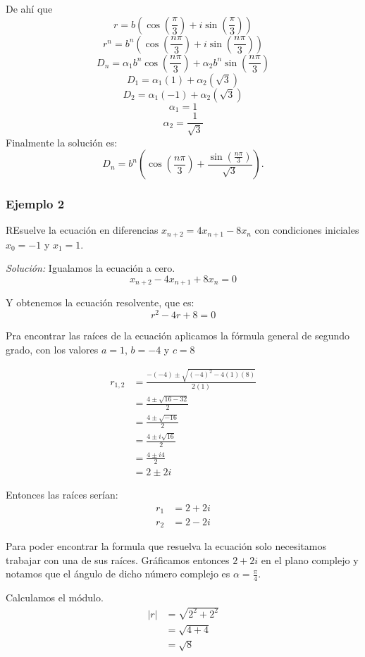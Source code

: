 \documentclass{report}
\begin{document}
De ahí que
  $$r=b(\cos(\frac{\pi}{3})+i\sin(\frac{\pi}{3}))$$
  $$r^n=b^n(\cos(\frac{n\pi}{3})+i\sin(\frac{n\pi}{3}))$$
  $$D_{n}=\alpha_{1}b^n\cos(\frac{n\pi}{3})+\alpha_{2}b^n\sin(\frac{n\pi}{3})$$
  $$D_{1}=\alpha_{1}(1)+\alpha_{2}(\sqrt{3})$$
  $$D_{2}=\alpha_{1}(-1)+\alpha_{2}(\sqrt{3})$$
  $$\alpha_{1}=1$$
  $$\alpha_{2}=\frac{1}{\sqrt{3}}$$
Finalmente la solución es:
\begin{equation}
  \label{solucion determinante}
D_{n}=b^n(\cos(\frac{n\pi}{3})+\frac{\sin(\frac{n\pi}{3})}{\sqrt{3}}).
\end{equation}

\subsubsection{Ejemplo 2}
REsuelve la ecuación en diferencias $x_{n+2}=4x_{n+1}-8x_n$ con condiciones iniciales $x_0=-1$ y $x_1=1$.

\textit{Solución:} 
Igualamos la ecuación a cero.
$$x_{n+2}-4x_{n+1}+8x_n=0$$

Y obtenemos la ecuación resolvente, que es: 
$$r^2-4r+8=0$$

Pra encontrar las raíces de la ecuación aplicamos la fórmula general de segundo grado, con los valores $a=1$, $b=-4$ y $c=8$

\begin{align*}
  r_{1,2}&=\frac{-(-4)\pm\sqrt{(-4)^2-4(1)(8)}}{2(1)}\\
  &=\frac{4\pm\sqrt{16-32}}{2}\\
  &=\frac{4\pm\sqrt{-16}}{2}\\
  &=\frac{4\pm i\sqrt{16}}{2}\\
  &=\frac{4\pm i4}{2}\\
  &=2\pm 2i
\end{align*}

Entonces las raíces serían:
\begin{align*}
  r_1&=2+2i\\
  r_2&=2-2i
\end{align*}

Para poder encontrar la formula que resuelva la ecuación solo necesitamos trabajar con una de sus raíces. Gráficamos entonces $2+2i$ en el plano complejo y notamos que el ángulo de dicho número complejo es $\alpha=\frac{\pi}{4}$.

Calculamos el módulo.
\begin{align*}
  |r|&=\sqrt{2^2+2^2}\\
     &=\sqrt{4+4}\\
     &=\sqrt{8}
\end{align*}
\end{document}
